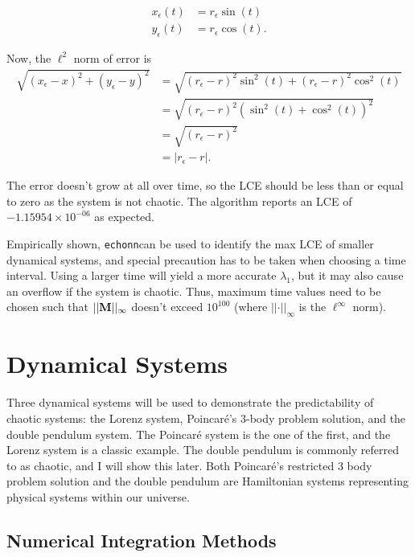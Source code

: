 \documentclass{article}
\newcommand{\echonn}{\texttt{echonn}}
\begin{document}
\begin{align*}
    x_\epsilon(t) &= r_\epsilon\sin(t) \\
    y_\epsilon(t) &= r_\epsilon\cos(t).
\end{align*}

Now, the $\ell^2$ norm of error is 
\begin{align*}
    \sqrt{(x_\epsilon - x)^2 + (y_\epsilon - y)^2} &= \sqrt{(r_\epsilon - r)^2\sin^2(t) + (r_\epsilon - r)^2\cos^2(t)} \\
    &= \sqrt{(r_\epsilon - r)^2(\sin^2(t) + \cos^2(t))^2} \\
    &= \sqrt{(r_\epsilon - r)^2} \\
    &= \vert r_\epsilon - r \vert.
\end{align*}

The error doesn't grow at all over time, so the LCE should be less than or equal to zero as the system is not chaotic. The algorithm reports an LCE of $-1.15954 \times 10^{-06}$ as expected.

Empirically shown, \echonn can be used to identify the max LCE of smaller 
dynamical systems, and special precaution has to be taken when choosing a 
time interval. Using a larger time will yield a more accurate $\lambda_1$, but 
it may also cause an overflow if the system is chaotic. Thus, 
maximum time values need to be chosen such that $\vert \vert \mathbf{M}\vert 
\vert_{\infty}$ doesn't exceed $10^{100}$ (where $\vert \vert \cdot \vert 
\vert_{\infty}$ is the $\ell^\infty$ norm).

\section{Dynamical Systems}

Three dynamical systems will be used to demonstrate the predictability of
chaotic systems: the Lorenz system, Poincaré's 3-body problem solution, and
the double pendulum system. The Poincaré system is the one of the first, and
the Lorenz system is a classic example. The double pendulum is commonly
referred to as chaotic, and I will show this later. Both Poincaré's
restricted 3 body problem solution and the double pendulum are Hamiltonian
systems representing physical systems within our universe.

\subsection{Numerical Integration Methods}
\end{document}
